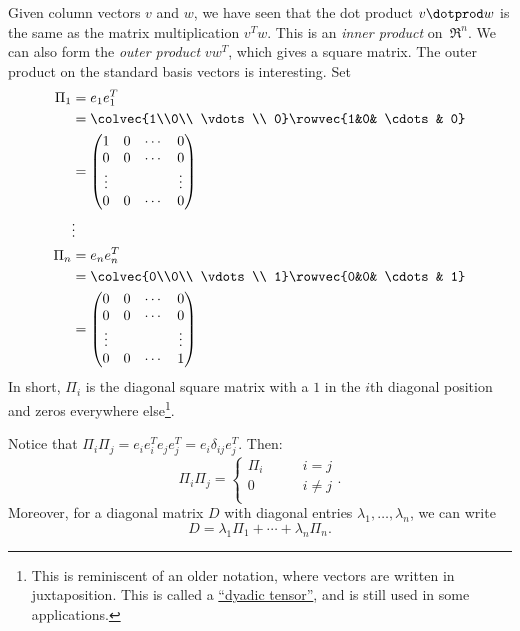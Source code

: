 Given column vectors $v$ and $w$, we have seen that the dot product $v\dotprod w$ is the same as the matrix multiplication $v^Tw$.  This is an \emph{inner product} on~$\Re^n$.  We can also form the \emph{outer product} $vw^T$, which gives a square matrix.
The outer product on the standard basis vectors is interesting.  Set 
\begin{align*}
\Pi_1 &= e_1e_1^T \\
  &= \colvec{1\\0\\ \vdots \\ 0} \rowvec{1&0& \cdots & 0}\\
  &= \begin{pmatrix}
      1 & 0 & \cdots & 0 \\
      0 & 0 & \cdots & 0 \\
      \vdots & & & \vdots \\
      0 & 0 &\cdots & 0
      \end{pmatrix}\\
&\vdots \\
\Pi_n &= e_n e_n^T \\
  &= \colvec{0\\0\\ \vdots \\ 1} \rowvec{0&0& \cdots & 1}\\
  &= \begin{pmatrix}
      0 & 0 & \cdots & 0 \\
      0 & 0 & \cdots & 0 \\
      \vdots & & & \vdots \\
      0 & 0 &\cdots & 1
      \end{pmatrix}
\end{align*}
In short, $\Pi_i$ is the diagonal square matrix with a $1$ in the $i$th diagonal position and zeros everywhere else\footnote{This is reminiscent of an older notation, where vectors are written in juxtaposition.  This is called a \href{http://en.wikipedia.org/wiki/Dyadic_tensor}{``dyadic tensor''}, and is still used in some applications. }.

Notice that 
$\Pi_i\Pi_j=e_ie_i^Te_je_j^T=e_i\delta_{ij}e_j^T$.  Then:
\[
\Pi_i\Pi_j = \left\{ \begin{array}{cc}
\Pi_i & \qquad i=j \\
0 & \qquad i\neq j \\
\end{array}\right. .
\]
Moreover, for a diagonal matrix $D$ with diagonal entries $\lambda_1,\ldots, \lambda_n$, we can write
\[
D= \lambda_1\Pi_1 + \cdots + \lambda_n\Pi_n.
\]

